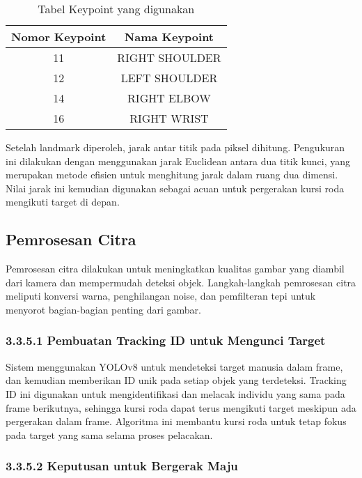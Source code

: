 \begin{table}[H]
\centering
\begin{tabular}{|c|c|}
\hline
Nomor Keypoint & Nama Keypoint \\
\hline
11 & RIGHT SHOULDER \\
12 & LEFT SHOULDER \\
14 & RIGHT ELBOW \\
16 & RIGHT WRIST \\
\hline
\end{tabular}
\caption{Tabel Keypoint yang digunakan}
\label{tab:keypoints}
\end{table}

Setelah landmark diperoleh, jarak antar titik pada piksel dihitung. Pengukuran ini dilakukan dengan menggunakan jarak Euclidean antara dua titik kunci, yang merupakan metode efisien untuk menghitung jarak dalam ruang dua dimensi. Nilai jarak ini kemudian digunakan sebagai acuan untuk pergerakan kursi roda mengikuti target di depan.

\subsection{Pemrosesan Citra}
\label{subsec:pemrosesan_citra}

Pemrosesan citra dilakukan untuk meningkatkan kualitas gambar yang diambil dari kamera dan mempermudah deteksi objek. Langkah-langkah pemrosesan citra meliputi konversi warna, penghilangan noise, dan pemfilteran tepi untuk menyorot bagian-bagian penting dari gambar.

\subsubsection{3.3.5.1 Pembuatan Tracking ID untuk Mengunci Target}
\label{subsubsec:tracking_id}

Sistem menggunakan YOLOv8 untuk mendeteksi target manusia dalam frame, dan kemudian memberikan ID unik pada setiap objek yang terdeteksi. Tracking ID ini digunakan untuk mengidentifikasi dan melacak individu yang sama pada frame berikutnya, sehingga kursi roda dapat terus mengikuti target meskipun ada pergerakan dalam frame. Algoritma ini membantu kursi roda untuk tetap fokus pada target yang sama selama proses pelacakan.

\subsubsection{3.3.5.2 Keputusan untuk Bergerak Maju}
\label{subsubsec:keputusan_bergerak_maju}

